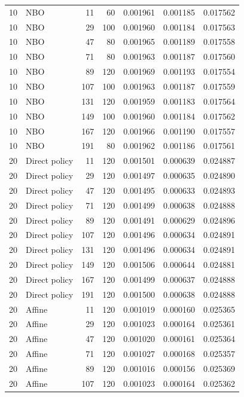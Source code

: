 {\begin{longtable}{rlrrrrr}
10 & NBO & 11 & 60 & 0.001961 & 0.001185 & 0.017562 \\
10 & NBO & 29 & 100 & 0.001960 & 0.001184 & 0.017563 \\
10 & NBO & 47 & 80 & 0.001965 & 0.001189 & 0.017558 \\
10 & NBO & 71 & 80 & 0.001963 & 0.001187 & 0.017560 \\
10 & NBO & 89 & 120 & 0.001969 & 0.001193 & 0.017554 \\
10 & NBO & 107 & 100 & 0.001963 & 0.001187 & 0.017559 \\
10 & NBO & 131 & 120 & 0.001959 & 0.001183 & 0.017564 \\
10 & NBO & 149 & 100 & 0.001960 & 0.001184 & 0.017562 \\
10 & NBO & 167 & 120 & 0.001966 & 0.001190 & 0.017557 \\
10 & NBO & 191 & 80 & 0.001962 & 0.001186 & 0.017561 \\
20 & Direct policy & 11 & 120 & 0.001501 & 0.000639 & 0.024887 \\
20 & Direct policy & 29 & 120 & 0.001497 & 0.000635 & 0.024890 \\
20 & Direct policy & 47 & 120 & 0.001495 & 0.000633 & 0.024893 \\
20 & Direct policy & 71 & 120 & 0.001499 & 0.000638 & 0.024888 \\
20 & Direct policy & 89 & 120 & 0.001491 & 0.000629 & 0.024896 \\
20 & Direct policy & 107 & 120 & 0.001496 & 0.000634 & 0.024891 \\
20 & Direct policy & 131 & 120 & 0.001496 & 0.000634 & 0.024891 \\
20 & Direct policy & 149 & 120 & 0.001506 & 0.000644 & 0.024881 \\
20 & Direct policy & 167 & 120 & 0.001499 & 0.000637 & 0.024888 \\
20 & Direct policy & 191 & 120 & 0.001500 & 0.000638 & 0.024888 \\
20 & Affine & 11 & 120 & 0.001019 & 0.000160 & 0.025365 \\
20 & Affine & 29 & 120 & 0.001023 & 0.000164 & 0.025361 \\
20 & Affine & 47 & 120 & 0.001020 & 0.000161 & 0.025364 \\
20 & Affine & 71 & 120 & 0.001027 & 0.000168 & 0.025357 \\
20 & Affine & 89 & 120 & 0.001016 & 0.000156 & 0.025369 \\
20 & Affine & 107 & 120 & 0.001023 & 0.000164 & 0.025362 \\

\end{longtable}}
